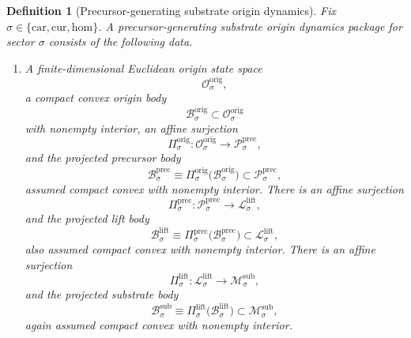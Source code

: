 \documentclass[11pt]{article}
\newcommand{\Car}{\mathrm{car}}
\newcommand{\Cur}{\mathrm{cur}}
\newcommand{\Hom}{\mathrm{hom}}
\newcommand{\SubSpace}[1]{\mathcal M_{#1}^{\mathrm{sub}}}
\newcommand{\SubBody}[1]{\mathcal B_{#1}^{\mathrm{sub}}}
\newcommand{\LiftSpace}[1]{\mathcal L_{#1}^{\mathrm{lift}}}
\newcommand{\LiftBody}[1]{\mathcal B_{#1}^{\mathrm{lift}}}
\newcommand{\LiftProj}[1]{\Pi_{#1}^{\mathrm{lift}}}
\newcommand{\PrecSpace}[1]{\mathcal P_{#1}^{\mathrm{prec}}}
\newcommand{\PrecBody}[1]{\mathcal B_{#1}^{\mathrm{prec}}}
\newcommand{\PrecProj}[1]{\Pi_{#1}^{\mathrm{prec}}}
\newcommand{\OrigSpace}[1]{\mathcal O_{#1}^{\mathrm{orig}}}
\newcommand{\OrigBody}[1]{\mathcal B_{#1}^{\mathrm{orig}}}
\newcommand{\OrigProj}[1]{\Pi_{#1}^{\mathrm{orig}}}
\newtheorem{definition}{Definition}
\begin{document}
\begin{definition}[Precursor-generating substrate origin dynamics]
\label{def:orig}
Fix \(\sigma\in\{\Car,\Cur,\Hom\}\). A \emph{precursor-generating substrate origin dynamics package} for sector \(\sigma\) consists of the following data.
\begin{enumerate}
    \item A finite-dimensional Euclidean origin state space
    \[
    \OrigSpace{\sigma},
    \]
    a compact convex origin body
    \[
    \OrigBody{\sigma}\subset\OrigSpace{\sigma}
    \]
    with nonempty interior, an affine surjection
    \[
    \OrigProj{\sigma}:\OrigSpace{\sigma}\to\PrecSpace{\sigma},
    \]
    and the projected precursor body
    \[
    \PrecBody{\sigma}
    \equiv
    \OrigProj{\sigma}\bigl(\OrigBody{\sigma}\bigr)
    \subset\PrecSpace{\sigma},
    \]
    assumed compact convex with nonempty interior. There is an affine surjection
    \[
    \PrecProj{\sigma}:\PrecSpace{\sigma}\to\LiftSpace{\sigma},
    \]
    and the projected lift body
    \[
    \LiftBody{\sigma}
    \equiv
    \PrecProj{\sigma}\bigl(\PrecBody{\sigma}\bigr)
    \subset\LiftSpace{\sigma},
    \]
    also assumed compact convex with nonempty interior. There is an affine surjection
    \[
    \LiftProj{\sigma}:\LiftSpace{\sigma}\to\SubSpace{\sigma},
    \]
    and the projected substrate body
    \[
    \SubBody{\sigma}
    \equiv
    \LiftProj{\sigma}\bigl(\LiftBody{\sigma}\bigr)
    \subset\SubSpace{\sigma},
    \]
    again assumed compact convex with nonempty interior.


\end{enumerate}
\end{definition}
\end{document}
